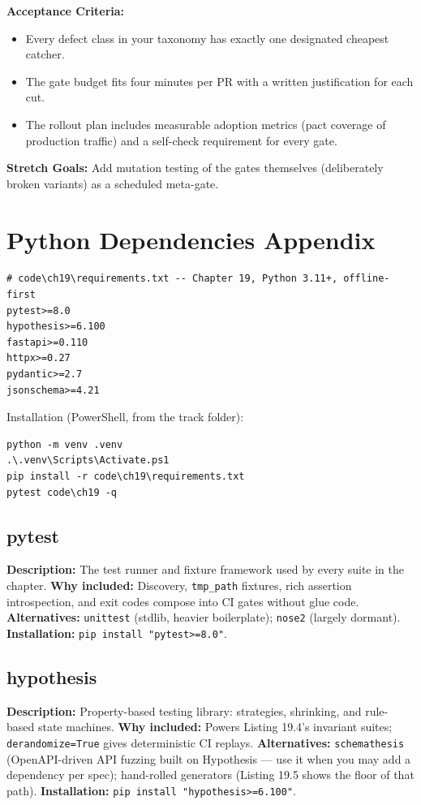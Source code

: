 \textbf{Acceptance Criteria:}
\begin{itemize}
  \item[$\square$] Every defect class in your taxonomy has exactly one
        designated cheapest catcher.
  \item[$\square$] The gate budget fits four minutes per PR with a written
        justification for each cut.
  \item[$\square$] The rollout plan includes measurable adoption metrics
        (pact coverage of production traffic) and a self-check requirement
        for every gate.
\end{itemize}

\textbf{Stretch Goals:} Add mutation testing of the gates themselves
(deliberately broken variants) as a scheduled meta-gate.

\section{Python Dependencies Appendix}
\label{sec:ch19-deps}

\begin{verbatim}
# code\ch19\requirements.txt -- Chapter 19, Python 3.11+, offline-first
pytest>=8.0
hypothesis>=6.100
fastapi>=0.110
httpx>=0.27
pydantic>=2.7
jsonschema>=4.21
\end{verbatim}

Installation (PowerShell, from the track folder):

\begin{verbatim}
python -m venv .venv
.\.venv\Scripts\Activate.ps1
pip install -r code\ch19\requirements.txt
pytest code\ch19 -q
\end{verbatim}

\subsection{pytest}
\textbf{Description:} The test runner and fixture framework used by every
suite in the chapter.
\textbf{Why included:} Discovery, \texttt{tmp\_path} fixtures, rich
assertion introspection, and exit codes compose into CI gates without
glue code.
\textbf{Alternatives:} \texttt{unittest} (stdlib, heavier boilerplate);
\texttt{nose2} (largely dormant).
\textbf{Installation:} \texttt{pip install "pytest>=8.0"}.

\subsection{hypothesis}
\textbf{Description:} Property-based testing library: strategies,
shrinking, and rule-based state machines.
\textbf{Why included:} Powers Listing 19.4's invariant suites;
\texttt{derandomize=True} gives deterministic CI replays.
\textbf{Alternatives:} \texttt{schemathesis} (OpenAPI-driven API fuzzing
built on Hypothesis --- use it when you may add a dependency per spec);
hand-rolled generators (Listing 19.5 shows the floor of that path).
\textbf{Installation:} \texttt{pip install "hypothesis>=6.100"}.

